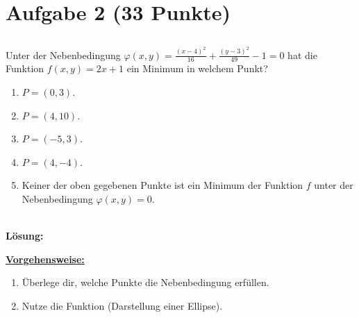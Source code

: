 \section*{Aufgabe 2 (33 Punkte)}
\vspace{0.4cm}
\subsection*{}
Unter der Nebenbedingung $ \varphi(x,y) = \frac{(x-4)^2}{16} + \frac{(y-3)^2}{49} -1 = 0 $ hat die Funktion $ f(x,y) = 2 x + 1  $ ein Minimum in welchem Punkt?
\renewcommand{\labelenumi}{(\alph{enumi})}
\begin{enumerate}
	\item $ P= (0,3) $.
	\item $ P= (4,10) $.
	\item $ P= (-5,3) $.
	\item $ P= (4,-4) $.
	\item Keiner der oben gegebenen Punkte ist ein Minimum der Funktion $ f $ unter der Nebenbedingung $ \varphi(x,y)= 0 $.
\end{enumerate}\ \\
\textbf{Lösung:}
\begin{mdframed}
\underline{\textbf{Vorgehensweise:}}
\renewcommand{\labelenumi}{\theenumi.}
\begin{enumerate}
\item Überlege dir, welche Punkte die Nebenbedingung erfüllen.
\item Nutze die Funktion (Darstellung einer Ellipse).
\end{enumerate}
\end{mdframed}

